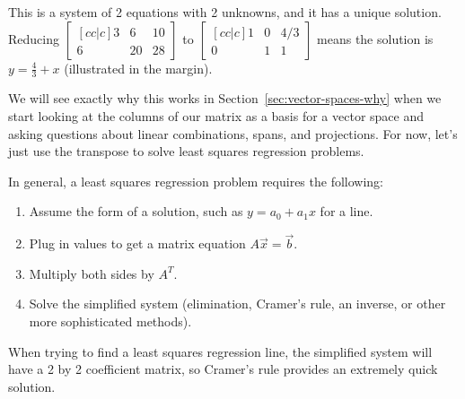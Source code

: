 \begin{example}
This is a system of 2 equations with 2 unknowns, and it has a unique solution.  
Reducing $\begin{bmatrix}[cc|c]3&6&10\\6&20&28\end{bmatrix}$ to $\begin{bmatrix}[cc|c]1&0&4/3\\0&1&1\end{bmatrix}$ means the solution is $y=\frac{4}{3}+x$ (illustrated in the margin).  


We will see exactly why this works in Section~\ref{sec:vector-spaces-why} when we start looking at the columns of our matrix as a basis for a vector space and asking questions about linear combinations, spans, and projections.   
For now, let's just use the transpose to solve least squares regression problems.
\end{example}

In general, a least squares regression problem requires the following:
\begin{enumerate}
	\item Assume the form of a solution, such as $y=a_0+a_1x$ for a line. 
	\item Plug in values to get a matrix equation $A\vec x=\vec b$. 
	\item Multiply both sides by $A^T$.
	\item Solve the simplified system (elimination, Cramer's rule, an inverse, or other more sophisticated methods). 
\end{enumerate}
When trying to find a least squares regression line, the simplified system will have a 2 by 2 coefficient matrix, so Cramer's rule provides an extremely quick solution.

